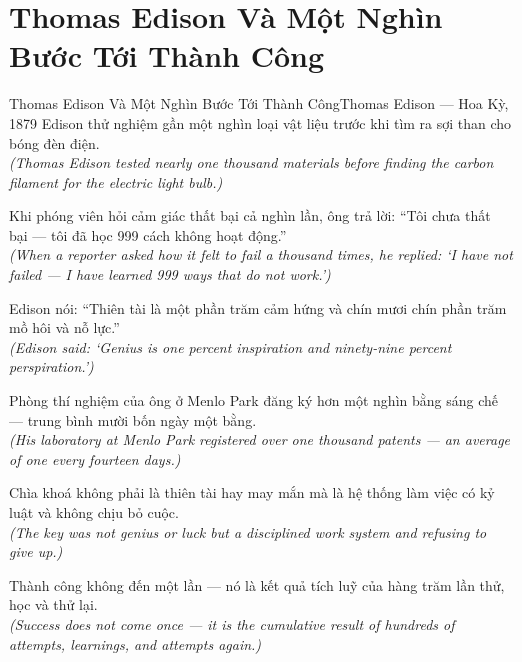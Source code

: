 \section{Thomas Edison Và Một Nghìn Bước Tới Thành Công}
\begin{truyen}{Thomas Edison Và Một Nghìn Bước Tới Thành Công}{Thomas Edison --- Hoa Kỳ, 1879}
 Edison thử nghiệm gần một nghìn loại vật liệu trước khi tìm ra sợi than cho bóng đèn điện.\\[4pt]
\textit{(Thomas Edison tested nearly one thousand materials before finding the carbon filament for the electric light bulb.)}

Khi phóng viên hỏi cảm giác thất bại cả nghìn lần, ông trả lời: ``Tôi chưa thất bại --- tôi đã học 999 cách không hoạt động.''\\[4pt]
\textit{(When a reporter asked how it felt to fail a thousand times, he replied: `I have not failed --- I have learned 999 ways that do not work.')}

Edison nói: ``Thiên tài là một phần trăm cảm hứng và chín mươi chín phần trăm mồ hôi và nỗ lực.''\\[4pt]
\textit{(Edison said: `Genius is one percent inspiration and ninety-nine percent perspiration.')}

Phòng thí nghiệm của ông ở Menlo Park đăng ký hơn một nghìn bằng sáng chế --- trung bình mười bốn ngày một bằng.\\[4pt]
\textit{(His laboratory at Menlo Park registered over one thousand patents --- an average of one every fourteen days.)}

Chìa khoá không phải là thiên tài hay may mắn mà là hệ thống làm việc có kỷ luật và không chịu bỏ cuộc.\\[4pt]
\textit{(The key was not genius or luck but a disciplined work system and refusing to give up.)}

\end{truyen}
\begin{baihoc}
  Thành công không đến một lần --- nó là kết quả tích luỹ của hàng trăm lần thử, học và thử lại.\\[4pt]
  \textit{(Success does not come once --- it is the cumulative result of hundreds of attempts, learnings, and attempts again.)}
\end{baihoc}

